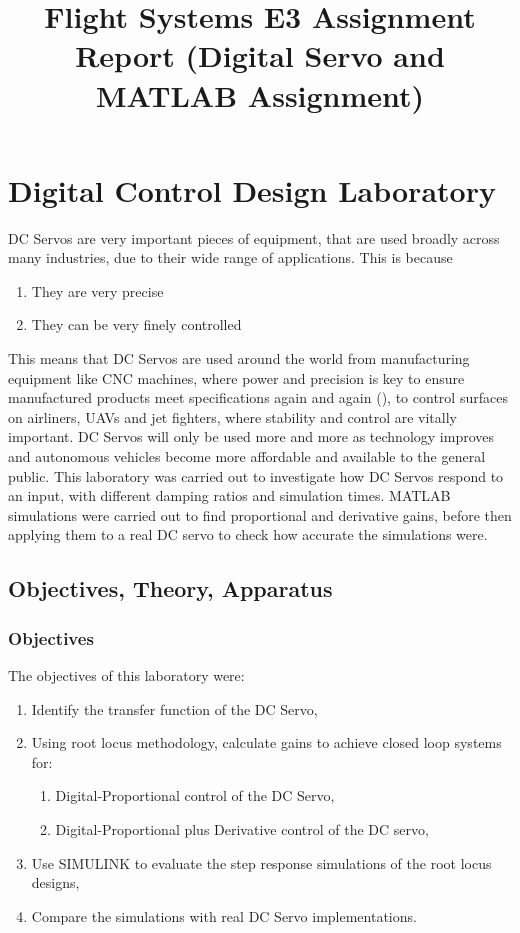 \documentclass[stu, a4paper, 12pt, floatsintext]{apa7}
\title{Flight Systems E3 Assignment Report (Digital Servo and MATLAB Assignment)}
\numberwithin{figure}{section}
\numberwithin{table}{section}
\numberwithin{equation}{section}
\begin{document}
\maketitle{} %

\tableofcontents

\newpage
\section{Digital Control Design Laboratory}
DC Servos are very important pieces of equipment, that are used broadly across many industries, due to their wide range of applications. This is because
\begin{enumerate}
    \item They are very precise
    \item They can be very finely controlled
\end{enumerate}
This means that DC Servos are used around the world from manufacturing equipment like CNC machines, where power and precision is key to ensure manufactured products meet specifications again and again (\cite{ISL}), to control surfaces on airliners, UAVs and jet fighters, where stability and control are vitally important. DC Servos will only be used more and more as technology improves and autonomous vehicles become more affordable and available to the general public. 
This laboratory was carried out to investigate how DC Servos respond to an input, with different damping ratios and simulation times. MATLAB simulations were carried out to find proportional and derivative gains, before then applying them to a real DC servo to check how accurate the simulations were. 
\subsection{Objectives, Theory, Apparatus}
\subsubsection{Objectives}
The objectives of this laboratory were:
\begin{enumerate}
    \item Identify the transfer function of the DC Servo,
    \item Using root locus methodology, calculate gains to achieve closed loop systems for:
    \begin {enumerate}
        \item Digital-Proportional control of the DC Servo,
        \item Digital-Proportional plus Derivative control of the DC servo,
    \end {enumerate}
    \item Use SIMULINK to evaluate the step response simulations of the root locus designs,
    \item Compare the simulations with real DC Servo implementations.
\end{enumerate}
\end{document}
